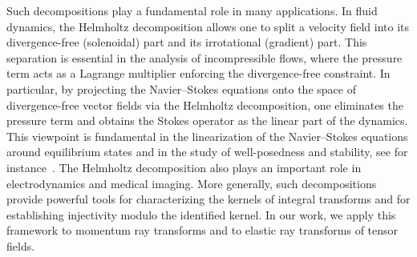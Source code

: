 \documentclass[11pt]{article}
\newcommand{\antti}[1]{\textcolor{red}{Antti's comment: #1}}
\begin{document}
Such decompositions play a fundamental role in many applications. In fluid dynamics, the Helmholtz decomposition allows one to split a velocity field into its divergence-free (solenoidal) part and its irrotational (gradient) part. This separation is essential in the analysis of incompressible flows, where the pressure term acts as a Lagrange multiplier enforcing the divergence-free constraint. In particular, by projecting the Navier–Stokes equations onto the space of divergence-free vector fields via the Helmholtz decomposition, one eliminates the pressure term and obtains the Stokes operator as the linear part of the dynamics. This viewpoint is fundamental in the linearization of the Navier–Stokes equations around equilibrium states and in the study of well-posedness and stability, see for instance~\cite{Chorin,Galdi}. The Helmholtz decomposition also plays an important role in electrodynamics and medical imaging. More generally, such decompositions provide powerful tools for characterizing the kernels of integral transforms and for establishing injectivity modulo the identified kernel. In our work, we apply this framework to momentum ray transforms and to elastic ray transforms of tensor fields.

\end{document}
